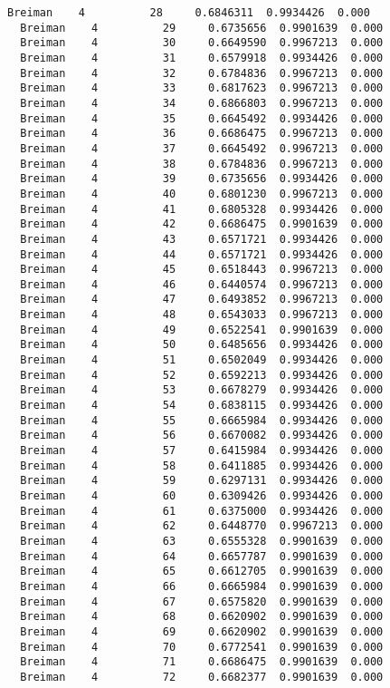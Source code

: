 \documentclass[11pt]{article}
\begin{document}
\begin{Verbatim}[commandchars=\\\{\}]
  Breiman    4          28     0.6846311  0.9934426  0.000
  Breiman    4          29     0.6735656  0.9901639  0.000
  Breiman    4          30     0.6649590  0.9967213  0.000
  Breiman    4          31     0.6579918  0.9934426  0.000
  Breiman    4          32     0.6784836  0.9967213  0.000
  Breiman    4          33     0.6817623  0.9967213  0.000
  Breiman    4          34     0.6866803  0.9967213  0.000
  Breiman    4          35     0.6645492  0.9934426  0.000
  Breiman    4          36     0.6686475  0.9967213  0.000
  Breiman    4          37     0.6645492  0.9967213  0.000
  Breiman    4          38     0.6784836  0.9967213  0.000
  Breiman    4          39     0.6735656  0.9934426  0.000
  Breiman    4          40     0.6801230  0.9967213  0.000
  Breiman    4          41     0.6805328  0.9934426  0.000
  Breiman    4          42     0.6686475  0.9901639  0.000
  Breiman    4          43     0.6571721  0.9934426  0.000
  Breiman    4          44     0.6571721  0.9934426  0.000
  Breiman    4          45     0.6518443  0.9967213  0.000
  Breiman    4          46     0.6440574  0.9967213  0.000
  Breiman    4          47     0.6493852  0.9967213  0.000
  Breiman    4          48     0.6543033  0.9967213  0.000
  Breiman    4          49     0.6522541  0.9901639  0.000
  Breiman    4          50     0.6485656  0.9934426  0.000
  Breiman    4          51     0.6502049  0.9934426  0.000
  Breiman    4          52     0.6592213  0.9934426  0.000
  Breiman    4          53     0.6678279  0.9934426  0.000
  Breiman    4          54     0.6838115  0.9934426  0.000
  Breiman    4          55     0.6665984  0.9934426  0.000
  Breiman    4          56     0.6670082  0.9934426  0.000
  Breiman    4          57     0.6415984  0.9934426  0.000
  Breiman    4          58     0.6411885  0.9934426  0.000
  Breiman    4          59     0.6297131  0.9934426  0.000
  Breiman    4          60     0.6309426  0.9934426  0.000
  Breiman    4          61     0.6375000  0.9934426  0.000
  Breiman    4          62     0.6448770  0.9967213  0.000
  Breiman    4          63     0.6555328  0.9901639  0.000
  Breiman    4          64     0.6657787  0.9901639  0.000
  Breiman    4          65     0.6612705  0.9901639  0.000
  Breiman    4          66     0.6665984  0.9901639  0.000
  Breiman    4          67     0.6575820  0.9901639  0.000
  Breiman    4          68     0.6620902  0.9901639  0.000
  Breiman    4          69     0.6620902  0.9901639  0.000
  Breiman    4          70     0.6772541  0.9901639  0.000
  Breiman    4          71     0.6686475  0.9901639  0.000
  Breiman    4          72     0.6682377  0.9901639  0.000

\end{Verbatim}
\end{document}
